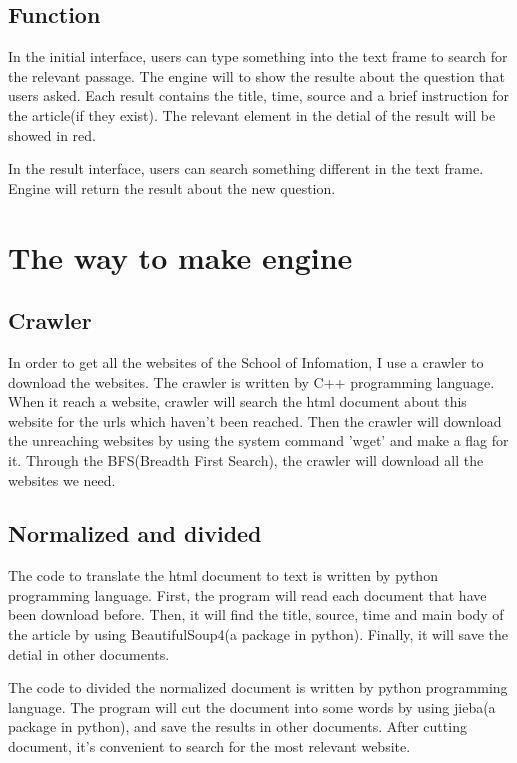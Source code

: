 \documentclass[a4paper]{article}
\begin{document}
	\subsection{Function} 
	
		In the initial interface, users can type something into the text frame to search for the relevant passage. The engine will to show the resulte about the question that users asked. Each result contains the title, time, source and a brief instruction for the article(if they exist). The relevant element in the detial of the result will be showed in red.
		
		In the result interface, users can search something different in the text frame. Engine will return the result about the new question.

\section{The way to make engine}
	
	\subsection{Crawler}
		
		In order to get all the websites of the School of Infomation, I use a crawler to download the websites. The crawler is written by C++ programming language. When it reach a website, crawler will search the html document about this website for the urls which haven't been reached. Then the crawler will download the unreaching websites by using the system command 'wget' and make a flag for it. Through the BFS(Breadth First Search), the crawler will download all the websites we need.
	
	\subsection{Normalized and divided}
		
		The code to translate the html document to text is written by python programming language. First, the program will read each document that have been download before. Then, it will find the title, source, time and main body of the article by using BeautifulSoup4(a package in python). Finally, it will save the detial in other documents.
		
		The code to divided the normalized document is written by python programming language. The program will cut the document into some words by using jieba(a package in python), and save the results in other documents. After cutting document, it's convenient to search for the most relevant website.
	
\end{document}
